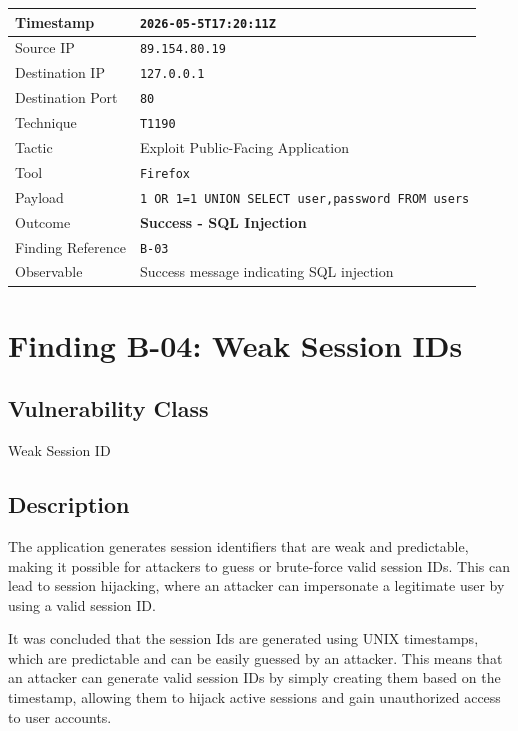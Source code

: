 \documentclass[11pt,a4paper]{report}
\begin{document}
    \begin{table}[h!]
    \centering
    \renewcommand{\arraystretch}{1.3}
    \begin{tabular}{|p{4cm}|p{9cm}|}
    \hline
    Timestamp & \texttt{2026-05-5T17:20:11Z} \\
    \hline
    Source IP & \texttt{89.154.80.19} \\
    \hline
    Destination IP & \texttt{127.0.0.1} \\
    \hline
    Destination Port & \texttt{80} \\
    \hline
    Technique & \texttt{T1190} \\
    \hline
    Tactic & Exploit Public-Facing Application \\
    \hline
    Tool & \texttt{Firefox} \\
    \hline
    Payload & \texttt{1 OR 1=1 UNION SELECT user,password FROM users} \\
    \hline
    Outcome & \textbf{Success - SQL Injection} \\
    \hline
    Finding Reference & \texttt{B-03} \\
    \hline
    Observable & Success message indicating SQL injection \\
    \hline
    \end{tabular}
    \end{table}

    \newpage

    \section{Finding B-04: Weak Session IDs}
    \label{sec:finding-b04}

    \subsection*{Vulnerability Class}
    Weak Session ID

    \subsection*{Description}
    The application generates session identifiers that are weak and predictable, making it possible for attackers to guess or brute-force valid session IDs. This can lead to session hijacking, where an attacker can impersonate a legitimate user by using a valid session ID.

    It was concluded that the session Ids are generated using UNIX timestamps, which are predictable and can be easily guessed by an attacker. This means that an attacker can generate valid session IDs by simply creating them based on the timestamp, allowing them to hijack active sessions and gain unauthorized access to user accounts.
    
\end{document}
